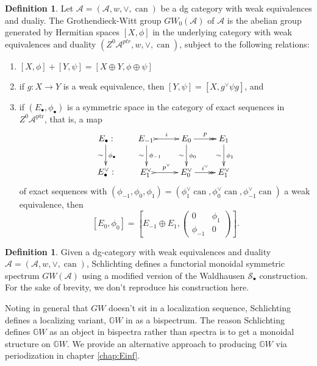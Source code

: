 \documentclass[edeposit,fullpage]{uiucthesis2009}
\newcommand{\mbb}{\mathbb}
\newcommand{\mc}{\mathcal}
\newcommand{\ptr}{\mathrm{ptr}}
\DeclareMathOperator{\can}{can}
\theoremstyle{plain}
\numberwithin{lemma}{section}
\theoremstyle{definition}
\newtheorem{definition}[lemma]{Definition}
\begin{document}
\begin{definition}
Let $\mathscr A = (\mc A,w,\vee,\can)$ be a dg category with weak
equivalences and dualiy. The Grothendieck-Witt group $GW_0(\mathscr
A)$ of $\mathscr A$ is the abelian group generated by Hermitian spaces
$[X,\phi]$ in the underlying category with weak equivalences and
duality $(Z^0\mc A^{ptr},w,\vee,\can)$, subject to the following
relations:
\begin{enumerate}
\item $[X,\phi] + [Y,\psi] = [X \oplus Y,\phi \oplus \psi]$
\item if $g : X \rightarrow Y$ is a weak equivalence, then $[Y,\psi] =
  [X,g^\vee \psi g]$, and
\item if $(E_\bullet,\phi_\bullet)$ is a symmetric space in the
  category of exact sequences in $Z^0\mc A^\ptr$, that is, a map
\[
\xymatrix{E_\bullet :  \ar[d]_\sim^{\phi_\bullet} \\ E^\vee_\bullet :}
\qquad \xymatrix{E_{-1} \, \ar@{>->}[r]^i \ar[d]_\sim^{\phi_{-1}} &
  E_0 \ar@{->>}[r]^p \ar[d]_\sim^{\phi_0} & E_1 \ar[d]_\sim^{\phi_1}
  \\
E_{1}^\vee \, \ar@{>->}[r]^{p^\vee} &
  E_0^\vee \ar@{->>}[r]^{i^\vee} & E_1^\vee }
\]
of exact sequences with $(\phi_{-1},\phi_0,\phi_1) = (\phi_1^\vee
\can, \phi_0^\vee \can, \phi^\vee_{-1}\can)$ a weak equivalence, then
\[
[E_0,\phi_0] = \left[E_{-1} \oplus E_1, \begin{pmatrix}
0 & \phi_1\\
\phi_{-1} & 0
\end{pmatrix} \right].
\]
\end{enumerate}
\end{definition}

\begin{definition}\label{def:GW_spectra}
Given a dg-category with weak equivalences and duality $\mathscr A = (\mc A,w,\vee,\can)$, Schlichting
defines \cite[Section 4.1]{Schder}  a functorial monoidal symmetric spectrum
$GW(\mathscr A)$ using a modified version of the Waldhausen $\mc
S_\bullet$ construction. For the sake of brevity, we don't reproduce
his construction here. 

Noting in general that $GW$ doesn't sit in a localization sequence,
Schlichting defines a localizing variant, $\mbb GW$ in \cite[Section
8.1]{Schder} as a bispectrum. The reason Schlichting defines
$\mbb GW$ as an object in bispectra rather than spectra is to get a monoidal structure
on $\mbb GW$. We provide an alternative approach to producing $\mbb
GW$ via periodization in chapter \ref{chap:Einf}. 
\end{definition}
\end{document}
